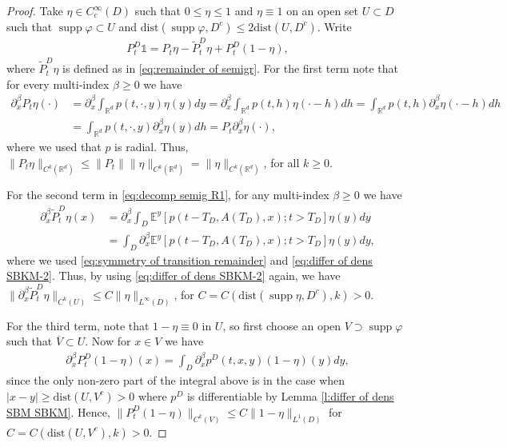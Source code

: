 \documentclass[reqno]{amsart}
\DeclareMathOperator\supp{supp}
\theoremstyle{remark}
\numberwithin{equation}{section} %
\newcommand{\R}{\mathbb{R}}
\newcommand{\dist}{\text{dist}}
\newcommand{\wt}{\widetilde}
\newcommand{\1}{\mathds{1}}
\begin{document}
\begin{proof}
		Take $\eta\in C_c^\infty(D)$ such that $0 \le \eta\le 1$ and $\eta\equiv 1$ on an open set $U\subset D$ such that  $\supp\varphi \subset U$ and $\dist(\supp \varphi,D^c)\le 2\dist(U,D^c)$. Write
		\begin{align}\label{eq:decomp semig R1}
			P^D_t\mathds{1}=P_t\eta-\wt  P^D_t\eta+ P^D_t(1-\eta),
		\end{align}
		where $\wt  P^D_t\eta$ is defined as in \eqref{eq:remainder of semigr}. For the first term note that for every multi-index $\beta \ge 0$ we have
		\begin{align*}
			\partial^\beta_x P_t\eta(\cdot)&=\partial^\beta_x\int_{\mathbb{R}^d}p(t,\cdot,y)\eta(y)dy=\partial^\beta_x\int_{\mathbb{R}^d}p(t,h)\eta(\cdot-h)dh=\int_{\mathbb{R}^d}p(t,h)\partial^\beta_x\eta(\cdot-h)dh\\
			&=\int_{\mathbb{R}^d}p(t,\cdot,y)\partial^\beta_x\eta(y)dh=P_t\partial^\beta_x\eta(\cdot),
		\end{align*}
		where we used that $p$ is radial. Thus, $\|P_t\eta\|_{C^k(\R ^d)}\le \|P_t\|\|\eta\|_{C^k(\R ^d)}=\|\eta\|_{C^k(\mathbb{R} ^d)}$, for all $k\ge 0$.
		
		For the second term in \eqref{eq:decomp semig R1}, for any multi-index $\beta\ge0$ we have
		\begin{align*}
			\partial^\beta_x\wt  P^D_t\eta(x) &=	\partial^\beta_x\int_D \mathds{E}^y\left[p(t-T_D,A({T_D}),x);t>T_D\right]\eta(y)dy\\
			&=\int_D \partial^\beta_x\mathds{E}^y\left[p(t-T_D,A({T_D}),x);t>T_D\right]\eta(y)dy,
		\end{align*}
		where we used \eqref{eq:symmetry of transition remainder} and \eqref{eq:differ of dens SBKM-2}. Thus, by using \eqref{eq:differ of dens SBKM-2} again,  we have $\|\partial^\beta_x\wt  P^D_t\eta\|_{C^k(U)}\le C\|\eta\|_{L^\infty(D)}$, for $C=C(\dist(\supp \eta,D^c),k)>0$.
		
		For the third term, note that $1-\eta\equiv 0$ in $U$, so first choose an open $V\supset \supp \varphi$  such that $\overline V\subset U$. Now for $x\in V$ we have
		\begin{align*}
			\partial^\beta_x  P^D_t(1-\eta)(x)=\int_D \partial^\beta_x p^D(t,x,y)(1-\eta)(y)dy,
		\end{align*}
		since the only non-zero part of the integral above is in the case when $|x-y|\ge \dist(U,V^c)>0$ where $p^D$ is differentiable by Lemma \ref{l:differ of dens SBM SBKM}. Hence, $\|  P^D_t(1-\eta)\|_{C^k(V)}\le C\|1-\eta\|_{L^1(D)}$ for $C=C(\dist(U,V^c),k)>0$.
		

\end{proof}
\end{document}
